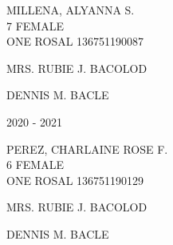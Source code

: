 \documentclass{article}
\begin{document}
{{\begin{multicols}{2}
\begin{center}
\end{center} 
\vspace{4mm} 
\phantom{Name:} \hspace*{5em} MILLENA, ALYANNA S. \\[2.5mm] %
\phantom{Age} \hspace*{8em} 7  \phantom{Sex} \hspace*{12em} FEMALE \\[2.5mm] %
\phantom{Grade} \hspace*{3em} ONE \phantom{Section} \hspace*{4em} ROSAL \phantom{LRN} \hspace*{4em} 136751190087 \\
\vspace*{25mm}
\begin{flushright}
MRS. RUBIE J. BACOLOD \hspace*{-1.5em}
\end{flushright}  
\vspace*{1.5mm}
\hspace*{3em} DENNIS M. BACLE
\end{multicols} 
\newpage
\begin{multicols}{2}
\phantom{u}
\columnbreak
\vspace*{-3mm}
\begin{center}
\phantom{school year:} \hspace*{6em} 2020 - 2021 
\end{center} 
\vspace{4mm} 
\phantom{Name:} \hspace*{5em} PEREZ, CHARLAINE ROSE F. \\[2.5mm] %
\phantom{Age} \hspace*{8em} 6  \phantom{Sex} \hspace*{12em} FEMALE \\[2.5mm] %
\phantom{Grade} \hspace*{3em} ONE \phantom{Section} \hspace*{4em} ROSAL \phantom{LRN} \hspace*{4em} 136751190129 \\
\vspace*{25mm}
\begin{flushright}
MRS. RUBIE J. BACOLOD \hspace*{-1.5em}
\end{flushright}  
\vspace*{1.5mm}
\hspace*{3em} DENNIS M. BACLE
\end{multicols} 
}}
\end{document}
